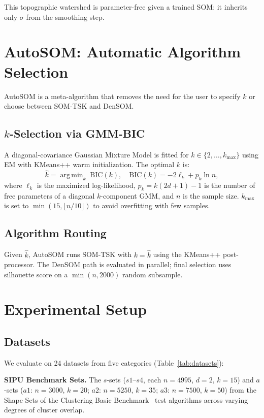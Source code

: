 \documentclass[journal]{IEEEtran}
\DeclareMathOperator*{\argmin}{arg\,min}
\begin{document}
This topographic watershed is parameter-free given a trained SOM: it inherits only $\sigma$ from the smoothing step.

\section{AutoSOM: Automatic Algorithm Selection}
\label{sec:autosom}

AutoSOM is a meta-algorithm that removes the need for the user to specify $k$ or choose between SOM-TSK and DenSOM.

\subsection{$k$-Selection via GMM-BIC}

A diagonal-covariance Gaussian Mixture Model is fitted for $k \in \{2,\ldots,k_{\max}\}$ using EM with KMeans++ warm initialization. The optimal $k$ is:
\begin{equation}
  \hat{k} = \argmin_{k} \;\mathrm{BIC}(k), \quad \mathrm{BIC}(k) = -2\ell_k + p_k \ln n,
\end{equation}
where $\ell_k$ is the maximized log-likelihood, $p_k = k(2d+1)-1$ is the number of free parameters of a diagonal $k$-component GMM, and $n$ is the sample size. $k_{\max}$ is set to $\min(15, \lfloor n/10 \rfloor)$ to avoid overfitting with few samples.

\subsection{Algorithm Routing}

Given $\hat{k}$, AutoSOM runs SOM-TSK with $k = \hat{k}$ using the KMeans++ post-processor. The DenSOM path is evaluated in parallel; final selection uses silhouette score on a $\min(n, 2000)$ random subsample.

\section{Experimental Setup}
\label{sec:experiments}

\subsection{Datasets}

We evaluate on 24 datasets from five categories (Table~\ref{tab:datasets}):

\textbf{SIPU Benchmark Sets.} The $s$-sets ($s1$--$s4$, each $n=4995$, $d=2$, $k=15$) and $a$-sets ($a1$: $n=3000$, $k=20$; $a2$: $n=5250$, $k=35$; $a3$: $n=7500$, $k=50$) from the Shape Sets of the Clustering Basic Benchmark~\cite{franti2018k} test algorithms across varying degrees of cluster overlap.
\end{document}
